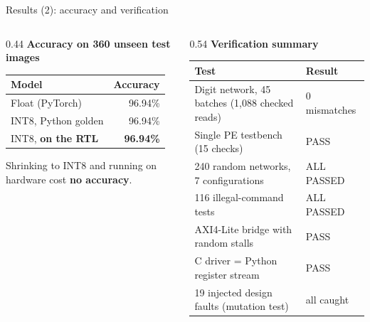 \documentclass[aspectratio=169,10pt,t]{beamer}
\begin{document}
\begin{frame}{Results (2): accuracy and verification}
  \begin{columns}[T]
    \begin{column}{0.44\textwidth}
      \small\textbf{Accuracy on 360 unseen test images}\\[3pt]
      \renewcommand{\arraystretch}{1.25}
      \begin{tabular}{@{}lr@{}}
        \toprule
        \textbf{Model} & \textbf{Accuracy}\\
        \midrule
        Float (PyTorch) & 96.94\%\\
        INT8, Python golden & 96.94\%\\
        INT8, \textbf{on the RTL} & \textbf{96.94\%}\\
        \bottomrule
      \end{tabular}

      \vspace{8pt}

      \footnotesize Shrinking to INT8 and running on hardware cost \textbf{no accuracy}.
    \end{column}
    \begin{column}{0.54\textwidth}
      \small\textbf{Verification summary}\\[3pt]
      \footnotesize
      \renewcommand{\arraystretch}{1.25}
      \begin{tabularx}{\textwidth}{@{}Xl@{}}
        \toprule
        \textbf{Test} & \textbf{Result}\\
        \midrule
        Digit network, 45 batches (1,088 checked reads) & 0 mismatches\\
        Single PE testbench (15 checks) & PASS\\
        240 random networks, 7 configurations & ALL PASSED\\
        116 illegal-command tests & ALL PASSED\\
        AXI4-Lite bridge with random stalls & PASS\\
        C driver = Python register stream & PASS\\
        19 injected design faults (mutation test) & all caught\\
        \bottomrule
      \end{tabularx}
    \end{column}
  \end{columns}
\end{frame}
\end{document}
